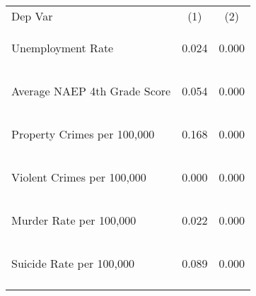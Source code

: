 \begin{center}
\begin{tabular}{lcc}
\hline \noalign{\smallskip}Dep Var & (1) & (2)\\
\noalign{\smallskip}\hline \noalign{\smallskip}Unemployment Rate & \begin{scriptsize}0.024\end{scriptsize} & \begin{scriptsize}0.000\end{scriptsize}\\
Average NAEP 4th Grade Score & \begin{scriptsize}0.054\end{scriptsize} & \begin{scriptsize}0.000\end{scriptsize}\\
Property Crimes per 100,000 & \begin{scriptsize}0.168\end{scriptsize} & \begin{scriptsize}0.000\end{scriptsize}\\
Violent Crimes per 100,000 & \begin{scriptsize}0.000\end{scriptsize} & \begin{scriptsize}0.000\end{scriptsize}\\
Murder Rate per 100,000 & \begin{scriptsize}0.022\end{scriptsize} & \begin{scriptsize}0.000\end{scriptsize}\\
Suicide Rate per 100,000 & \begin{scriptsize}0.089\end{scriptsize} & \begin{scriptsize}0.000\end{scriptsize}\\
\noalign{\smallskip}\hline\end{tabular}\\
\end{center}
